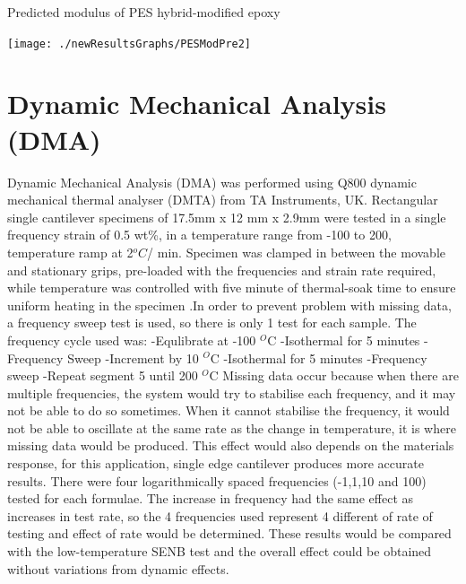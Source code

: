\documentclass[numbers=noendperiod,chapterprefix=on]{icldt} %
\begin{document}
\begin{table}[!htpb]
\centering
\caption{Predicted modulus of PES hybrid-modified epoxy} %
\texttt{[image: ./newResultsGraphs/PESModPre2]}\label{PESModPre2}
\end{table}
\FloatBarrier

\section{Dynamic Mechanical Analysis (DMA)}
Dynamic Mechanical Analysis (DMA) was performed using Q800 dynamic mechanical thermal analyser (DMTA) from TA Instruments, UK. Rectangular single cantilever specimens of 17.5mm x 12 mm x 2.9mm were tested in a single frequency strain of 0.5 wt\%, in a temperature range from -100 to 200, temperature ramp at 2$^oC$/ min. Specimen was clamped in between the movable and stationary grips, pre-loaded with the frequencies and strain rate required, while temperature was controlled with five minute of thermal-soak time to ensure uniform heating in the specimen \cite{D50232007}.In order to prevent problem with missing data, a frequency sweep test is used, so there is only 1 test for each sample.
The frequency cycle used was:\newline
-Equlibrate at -100 $^O$C
-Isothermal for 5 minutes\newline
-Frequency Sweep\newline
-Increment by 10 $^O$C\newline
-Isothermal for 5 minutes\newline
-Frequency sweep\newline
-Repeat segment 5 until 200 $^O$C
\newline
 Missing data occur because when there are multiple frequencies, the system would try to stabilise each frequency, and it may not be able to do so sometimes. When it cannot stabilise the frequency, it would not be able to oscillate at the same rate as the change in temperature, it is where missing data would be produced. This effect would also depends on the materials response, for this application, single edge cantilever produces more accurate results.
There were four logarithmically spaced frequencies (-1,1,10 and 100) tested for each formulae. The increase in frequency had the same effect as increases in test rate, so the 4 frequencies used represent 4 different of rate of testing and effect of rate would be determined. These results would be compared with the low-temperature SENB test and the overall effect could be obtained without variations from dynamic effects.
\end{document}
